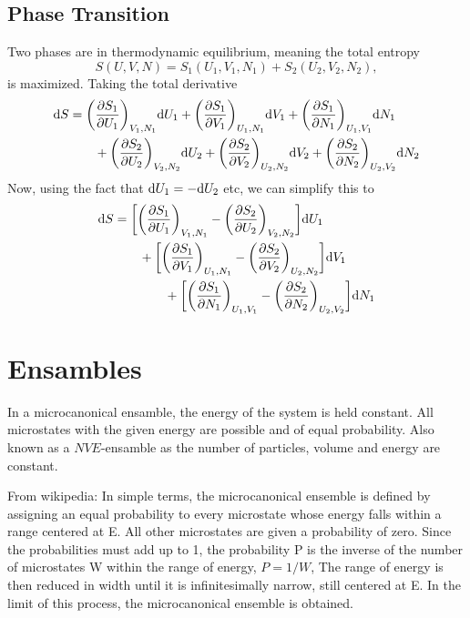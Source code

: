 \documentclass[a4paper, 11pt, notitlepage, english]{article}
\renewcommand{\d}{{\rm d}}
\renewcommand{\b}{\bigg}
\newcommand{\p}{\partial}
\begin{document}
\subsection*{Phase Transition}
Two phases are in thermodynamic equilibrium, meaning the total entropy
$$S(U,V,N) = S_1(U_1,V_1,N_1) + S_2(U_2,V_2,N_2),$$
is maximized. Taking the total derivative
\begin{align*}
\d S &= \b(\frac{\p S_1}{\p U_1}\b)_{V_1, N_1} \d U_1 + \b(\frac{\p S_1}{\p V_1}\b)_{U_1, N_1} \d V_1 + \b(\frac{\p S_1}{\p N_1}\b)_{U_1, V_1} \d N_1 \\
&\qquad + \b(\frac{\p S_2}{\p U_2}\b)_{V_2, N_2} \d U_2 + \b(\frac{\p S_2}{\p V_2}\b)_{U_2, N_2} \d V_2 + \b(\frac{\p S_2}{\p N_2}\b)_{U_2, V_2} \d N_2 \\
\end{align*}
Now, using the fact that $\d U_1 = -\d U_2$ etc, we can simplify this to
\begin{align*}
\d S &= \b[\b(\frac{\p S_1}{\p U_1}\b)_{V_1, N_1} - \b(\frac{\p S_2}{\p U_2}\b)_{V_2, N_2} \b] \d U_1 \\
&\qquad  + \b[\b(\frac{\p S_1}{\p V_1}\b)_{U_1, N_1} - \b(\frac{\p S_2}{\p V_2}\b)_{U_2, N_2}\b]\d V_1 \\
&\qquad\qquad+ \b[\b(\frac{\p S_1}{\p N_1}\b)_{U_1, V_1} - \b(\frac{\p S_2}{\p N_2}\b)_{U_2, V_2} \b]\d N_1 \\
\end{align*}


\section*{Ensambles}

In a microcanonical ensamble, the energy of the system is held constant. All microstates with the given energy are possible and of equal probability. Also known as a $NVE$-ensamble as the number of particles, volume and energy are constant.

From wikipedia:
In simple terms, the microcanonical ensemble is defined by assigning an equal probability to every microstate whose energy falls within a range centered at E. All other microstates are given a probability of zero. Since the probabilities must add up to 1, the probability P is the inverse of the number of microstates W within the range of energy,
$P = 1/W$,
The range of energy is then reduced in width until it is infinitesimally narrow, still centered at E. In the limit of this process, the microcanonical ensemble is obtained.
\end{document}
